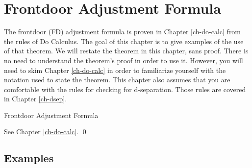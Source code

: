 \chapter{Frontdoor Adjustment Formula}
\label{ch-fdoor}
The frontdoor (FD) adjustment
formula is proven in
Chapter \ref{ch-do-calc}
from the rules of Do Calculus.
The goal 
of this chapter is
to give examples
of the use of that
theorem. We will restate
the theorem in this chapter,
sans proof.
There is no need
to understand the
theorem's
proof in order to use it.
However, you
will
need to skim Chapter \ref{ch-do-calc}
in order to familiarize 
yourself with
the notation used to state the 
theorem.
This chapter also assumes
that you are comfortable 
with the  rules 
for checking for d-separation. Those rules
are covered in Chapter \ref{ch-dsep}.


\fdoordef

\begin{claim} Frontdoor Adjustment Formula

\fdoorclaim

\end{claim}
\proof 
See Chapter \ref{ch-do-calc}.
\qed

\section{Examples}

